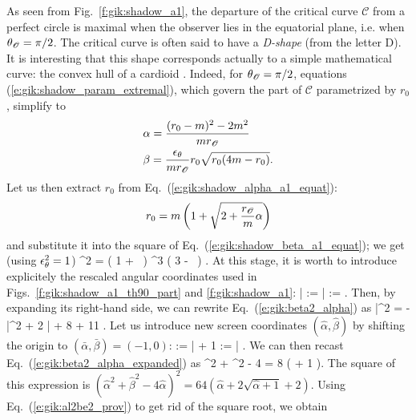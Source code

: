 As seen from Fig.~\ref{f:gik:shadow_a1}, the departure of the critical curve
$\mathscr{C}$ from a perfect circle is maximal when the observer lies in the equatorial
plane, i.e. when $\theta_{\mathscr{O}} = \pi/2$. The critical curve is often said to have
a \emph{D-shape} (from the letter D). It is interesting that this shape
corresponds actually to a simple mathematical curve: the convex hull of a
cardioid \cite{FarahPJB20}.
Indeed, for $\theta_{\mathscr{O}} = \pi/2$, equations (\ref{e:gik:shadow_param_extremal}),
which govern the part of $\mathscr{C}$ parametrized by $r_0$,
simplify to
\begin{subequations}
\begin{align}
    & \alpha = \frac{(r_0 - m)^2 - 2 m^2}{m r_{\mathscr{O}}} \label{e:gik:shadow_alpha_a1_equat} \\
    & \beta = \frac{\epsilon_\theta}{m r_{\mathscr{O}}} r_0 \sqrt{r_0(4 m - r_0)} . \label{e:gik:shadow_beta_a1_equat}
\end{align}
\end{subequations}
Let us then extract $r_0$ from Eq.~(\ref{e:gik:shadow_alpha_a1_equat}):
\[
    r_0 = m \left( 1 + \sqrt{2 + \frac{r_{\mathscr{O}}}{m}\alpha} \right)
\]
and substitute it into the square of Eq.~(\ref{e:gik:shadow_beta_a1_equat}); we get (using $\epsilon_\theta^2 = 1$)
\be \label{e:gik:beta2_alpha}
    \beta^2 =  \left( 1 + \,  \right) ^3
    \left( 3 -   \, \right) .
\ee
At this stage, it is worth to introduce explicitely the rescaled angular coordinates used
in Figs.~\ref{f:gik:shadow_a1_th90_part} and \ref{f:gik:shadow_a1}:
\be \label{e:gik:def_bar_alp_bet}
    \bar{\alpha} :=  \alpha \qand
    \bar{\beta} :=  \beta .
\ee
Then, by expanding its right-hand side, we can rewrite Eq.~(\ref{e:gik:beta2_alpha}) as
\be \label{e:gik:beta2_alpha_expanded}
    \bar{\beta}^2 = - \bar{\alpha}^2 + 2 \bar{\alpha} + 8  + 11 .
\ee
Let us introduce new screen coordinates $(\hat{\alpha}, \hat{\beta})$ by
shifting the origin to $(\bar{\alpha},\bar{\beta}) = (-1, 0)$:
\be
    \hat{\alpha} := \bar{\alpha} + 1  \qand
    \hat{\beta} := \bar{\beta} .
\ee
We can then recast Eq.~(\ref{e:gik:beta2_alpha_expanded}) as
\be \label{e:gik:al2be2_prov}
    \hat{\alpha}^2 + \hat{\beta}^2 - 4 \hat{\alpha} = 8 \left(  + 1 \right).
\ee
The square of this expression is
$(\hat{\alpha}^2 + \hat{\beta}^2  - 4 \hat{\alpha})^2 =
    64 ( \hat{\alpha} + 2 \sqrt{\hat{\alpha} + 1} + 2 )$.
Using Eq.~(\ref{e:gik:al2be2_prov}) to get rid of the square root, we obtain

